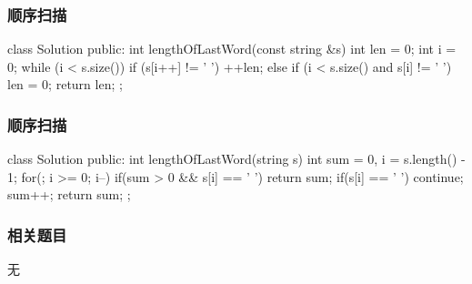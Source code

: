\subsubsection{顺序扫描}
\begin{Code}
class Solution {
public:
    int lengthOfLastWord(const string &s) {
        int len = 0;
        int i = 0;
        while (i < s.size()) {
            if (s[i++] != ' ') {
                ++len;
            } else if (i < s.size() and s[i] != ' ') {
                len = 0;
            }
        }
        return len;
    }
};
\end{Code}

\subsubsection{顺序扫描}
\begin{Code}
class Solution {
public:
    int lengthOfLastWord(string s) {
        int sum = 0, i = s.length() - 1;
        for(; i >= 0; i--) {
            if(sum > 0 && s[i] == ' ') {
                return sum;
            }
            if(s[i] == ' ') {
                continue;
            }
            sum++;
        }
        return sum;
    }
};
\end{Code}

\subsubsection{相关题目}
\begindot
\item 无
\myenddot
